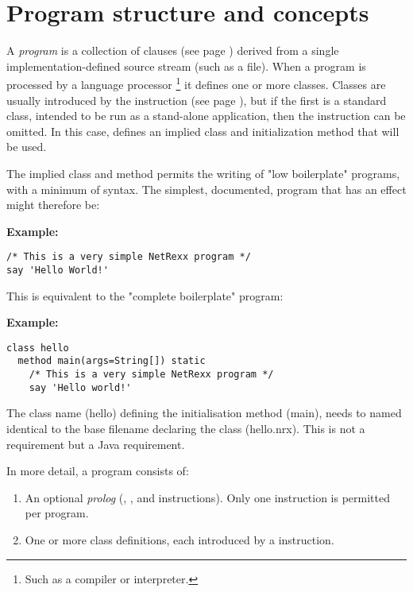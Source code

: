 \chapter{Program structure and concepts} \label{refpstruct}
 A \nr{} \emph{program} is a collection of
 clauses (see page \pageref{refclau})  derived from a single implementation-defined
source stream (such as a file).
When a program is processed by a language processor
\footnote{
Such as a compiler or interpreter.
}
it defines one or more classes.
Classes are usually introduced by the   instruction (see page \pageref{refclass}), but if the first is a standard class, intended to be
run as a stand-alone application, then the  instruction
can be omitted.  In this case, \nr{} defines an implied class
and initialization method that will be used.
 
The implied class and method permits the writing of "low
boilerplate" programs, with a minimum of syntax.
The simplest, documented, \nr{} program that has an effect might
therefore be:
 
\textbf{Example:}
\begin{lstlisting}[label=hello,caption=hello.nrx]
/* This is a very simple NetRexx program */
say 'Hello World!'
\end{lstlisting}

This is equivalent to the "complete boilerplate" program:

\textbf{Example:}
\begin{lstlisting}[label=hello,caption=hello.nrx]
class hello
  method main(args=String[]) static
    /* This is a very simple NetRexx program */
    say 'Hello world!'
\end{lstlisting}
The class name (hello) defining the initialisation method (main), needs to named identical to the base filename declaring the class (hello.nrx).
This is not a \nr{} requirement but a Java requirement.

In more detail, a \nr{} program consists of:
\begin{enumerate}
\item An optional \emph{prolog} (, , and
 instructions).  Only one  instruction
is permitted per program.
\item  One or more class definitions, each introduced by a 
instruction.
\end{enumerate}
 
